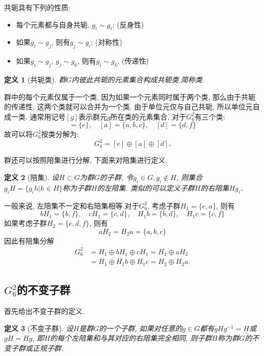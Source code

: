 \documentclass[UTF8]{ctexart}
\newtheorem{define}{定义}
\begin{document}
共轭具有下列的性质:
\begin{itemize}
\item 每个元素都与自身共轭, $g_i \sim g_i$; (反身性)
\item 如果$g_i \sim g_j$, 则有$g_j \sim g_i$; (对称性)
\item 如果$g_i \sim g_j$, $g_j \sim g_k$, 则有$g_i \sim g_k$. (传递性)
\end{itemize}

\begin{define}[共轭类]
群$G$内彼此共轭的元素集合构成共轭类,简称类. 
\end{define}

群中的每个元素仅属于一个类, 因为如果一个元素同时属于两个类, 那么由于共轭的传递性, 这两个类就可以合并为一个类. 由于单位元仅与自己共轭, 所以单位元自成一类. 通常用记号$[g]$表示群元$g$所在类的元素集合. 对于$G_6^2$有三个类:
\begin{equation}
[e] = \{e\}, \quad [a] = \{a, b, c\}, \quad [d] = \{d, f\}
\end{equation}
故可以将$G_6^2$按类分解为:
\begin{equation}
G_6^2 = [e] \oplus [a] \oplus [d].
\end{equation}

群还可以按照陪集进行分解, 下面来对陪集进行定义. 
\begin{define}[陪集]
设$H \subset G$为群$G$的子群, 令$g_i \in G, g_i \notin H$, 则集合$g_i H = \{g_i h | h \in H\}$称为子群$H$的左陪集. 类似的可以定义子群$H$的右陪集$H g_i$. 
\end{define}

一般来说, 左陪集不一定和右陪集相等.对于$G_6^2$, 考虑子群$H_1 = \{e, a\}$, 则有
\begin{equation}
b H_1 = \{b, f\}, \quad c H_1 = \{c, d\}, \quad H_1 b = \{b,d\}, \quad H_1 c = \{c, f\}
\end{equation}
如果考虑子群$H_2 = \{e, d, f\}$, 则有
\begin{equation}
a H_2 = H_2 a = \{a, b, c\}
\end{equation}
因此有陪集分解
\begin{equation}
\begin{split}
G_6^2 &= H_1 \oplus b H_1 \oplus c H_1 = H_2 \oplus a H_2 \\
 &= H_1 \oplus H_1 b \oplus H_1 c = H_2 \oplus H_2 a.
\end{split}
\end{equation}
\subsection{$G_6^2$的不变子群}
首先给出不变子群的定义. 
\begin{define}[不变子群]
设$H$是群$G$的一个子群, 如果对任意的$g \in G$都有$gHg^{-1}=H$或$gH = Hg$, 即$H$的每个左陪集和与其对应的右陪集完全相同, 则子群$H$称为群$G$的不变子群或正规子群. 
\end{define}
\end{document}
